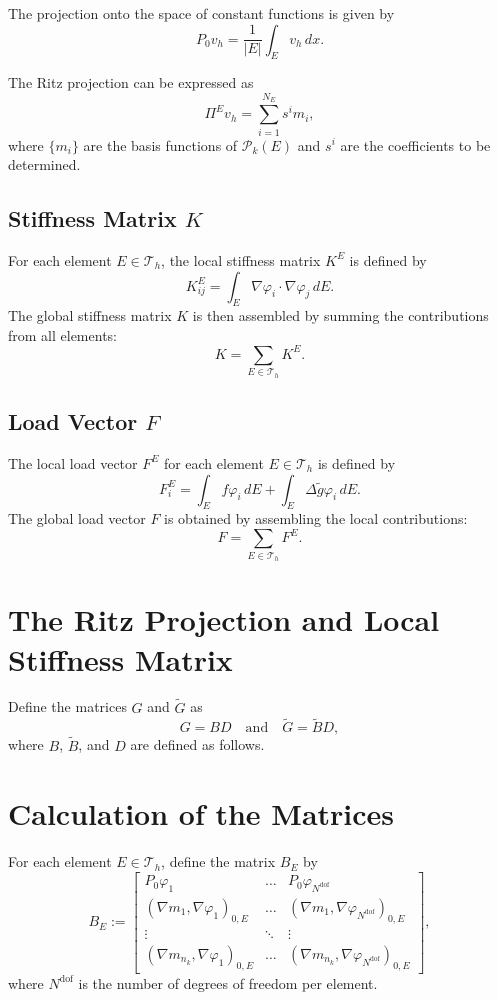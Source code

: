 \documentclass[class=article, crop=false]{standalone}
\begin{document}
The projection onto the space of constant functions is given by
\[
P_0 v_h = \frac{1}{|E|} \int_E v_h \, dx.
\]

The Ritz projection can be expressed as
\[
\Pi^E v_h = \sum_{i=1}^{N_E} s^i m_i,
\]
where $\{m_i\}$ are the basis functions of $\mathcal{P}_k(E)$ and $s^i$ are the coefficients to be determined.


\subsection{Stiffness Matrix $K$}
For each element $E \in \mathcal{T}_h$, the local stiffness matrix $K^E$ is defined by
\[
K^E_{ij} = \int_E \nabla \varphi_i \cdot \nabla \varphi_j \, dE.
\]
The global stiffness matrix $K$ is then assembled by summing the contributions from all elements:
\begin{equation}
    K = \sum_{E \in \mathcal{T}_h} K^E.
\end{equation}

\subsection{Load Vector $F$}
The local load vector $F^E$ for each element $E \in \mathcal{T}_h$ is defined by
\[
F^E_i = \int_E f \varphi_i \, dE + \int_E \Delta\tilde{g} \varphi_i \, dE.
\]
The global load vector $F$ is obtained by assembling the local contributions:
\begin{equation}
    F = \sum_{E \in \mathcal{T}_h} F^E.
\end{equation}

\section{The Ritz Projection and Local Stiffness Matrix}
Define the matrices $G$ and $\tilde{G}$ as
\[
G = BD \quad \text{and} \quad \tilde{G} = \tilde{B} D,
\]
where $B$, $\tilde{B}$, and $D$ are defined as follows.

\section{Calculation of the Matrices}
For each element $E \in \mathcal{T}_h$, define the matrix $B_E$ by
\[
B_E := \begin{bmatrix}
    P_0 \varphi_1 & \hdots & P_0 \varphi_{N^\text{dof}} \\
    (\nabla m_1, \nabla \varphi_1)_{0,E} & \hdots & (\nabla m_1, \nabla \varphi_{N^\text{dof}})_{0,E} \\
    \vdots & \ddots & \vdots \\
    (\nabla m_{n_k}, \nabla \varphi_1)_{0,E} & \hdots & (\nabla m_{n_k}, \nabla \varphi_{N^\text{dof}})_{0,E}
\end{bmatrix},
\]
where $N^\text{dof}$ is the number of degrees of freedom per element.
\end{document}
